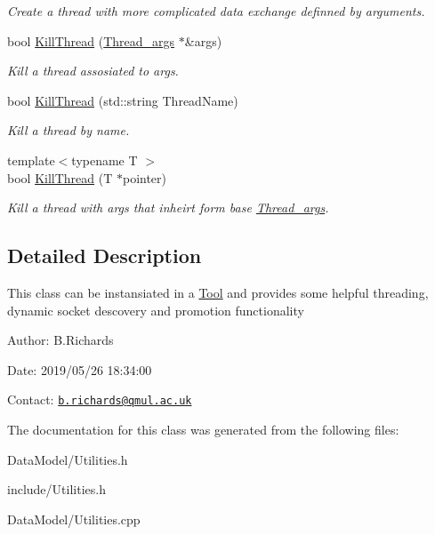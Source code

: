 \begin{DoxyCompactItemize}
\begin{DoxyCompactList}\small\item\em Create a thread with more complicated data exchange definned by arguments. \end{DoxyCompactList}\item 
\hypertarget{classUtilities_a6f1c1d53b9ce59bb26c56a3bebdbb255}{bool \hyperlink{classUtilities_a6f1c1d53b9ce59bb26c56a3bebdbb255}{Kill\-Thread} (\hyperlink{structThread__args}{Thread\-\_\-args} $\ast$\&args)}\label{classUtilities_a6f1c1d53b9ce59bb26c56a3bebdbb255}

\begin{DoxyCompactList}\small\item\em Kill a thread assosiated to args. \end{DoxyCompactList}\item 
\hypertarget{classUtilities_a8c17a46ce33b0b647797f24bc859bd7a}{bool \hyperlink{classUtilities_a8c17a46ce33b0b647797f24bc859bd7a}{Kill\-Thread} (std\-::string Thread\-Name)}\label{classUtilities_a8c17a46ce33b0b647797f24bc859bd7a}

\begin{DoxyCompactList}\small\item\em Kill a thread by name. \end{DoxyCompactList}\item 
\hypertarget{classUtilities_af4091a68d8a27a3b806d029cc9b2135e}{{\footnotesize template$<$typename T $>$ }\\bool \hyperlink{classUtilities_af4091a68d8a27a3b806d029cc9b2135e}{Kill\-Thread} (T $\ast$pointer)}\label{classUtilities_af4091a68d8a27a3b806d029cc9b2135e}

\begin{DoxyCompactList}\small\item\em Kill a thread with args that inheirt form base \hyperlink{structThread__args}{Thread\-\_\-args}. \end{DoxyCompactList}\end{DoxyCompactItemize}


\subsection{Detailed Description}
This class can be instansiated in a \hyperlink{classTool}{Tool} and provides some helpful threading, dynamic socket descovery and promotion functionality

\begin{DoxyParagraph}{Author\-:}
B.\-Richards 
\end{DoxyParagraph}
\begin{DoxyParagraph}{Date\-:}
2019/05/26 18\-:34\-:00 
\end{DoxyParagraph}
Contact\-: \href{mailto:b.richards@qmul.ac.uk}{\tt b.\-richards@qmul.\-ac.\-uk} 

The documentation for this class was generated from the following files\-:\begin{DoxyCompactItemize}
\item 
Data\-Model/Utilities.\-h\item 
include/Utilities.\-h\item 
Data\-Model/Utilities.\-cpp\end{DoxyCompactItemize}
